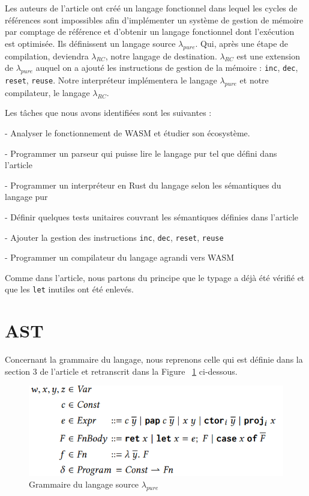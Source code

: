 \documentclass{rapportECL}
\begin{document}
Les auteurs de l'article\cite{ullrich_counting_2020} ont créé un langage fonctionnel dans lequel les cycles de références 
sont impossibles afin d'implémenter un système de gestion de mémoire par comptage de référence et d'obtenir un langage fonctionnel 
dont l'exécution est optimisée. Ils définissent un langage source $\lambda_{pure}$. 
Qui, après une étape de compilation, deviendra $\lambda_{RC}$, notre langage de destination.
$\lambda_{RC}$ est une extension de $\lambda_{pure}$ auquel on a ajouté les instructions de gestion de la mémoire : 
\verb|inc|, \verb|dec|, \verb|reset|, \verb|reuse|.
Notre interpréteur implémentera le langage $\lambda_{pure}$ et notre compilateur, le langage $\lambda_{RC}$.


Les tâches que nous avons identifiées sont les suivantes :

- Analyser le fonctionnement de WASM et étudier son écosystème.

- Programmer un parseur qui puisse lire le langage pur tel que défini dans l'article\cite{ullrich_counting_2020}

- Programmer un interpréteur en Rust du langage selon les sémantiques du langage pur

- Définir quelques tests unitaires couvrant les sémantiques définies dans l'article

- Ajouter la gestion des instructions \verb|inc|, \verb|dec|, \verb|reset|, \verb|reuse|

- Programmer un compilateur du langage agrandi vers WASM

Comme dans l'article, nous partons du principe que le typage a déjà été vérifié et que les \verb|let| inutiles ont été enlevés.

\section{AST}

Concernant la grammaire du langage, nous reprenons celle qui est définie dans la section 3 de l'article et retranscrit dans la Figure ~\ref{fig:grammaire pure} ci-dessous.

\begin{figure}[hbt!]
	\centering
	\includegraphics[scale=0.65]{logos/grammaire.png}
	\caption{Grammaire du langage source $\lambda_{pure}$}
	\label{fig:grammaire pure}
\end{figure}
\FloatBarrier
\end{document}
